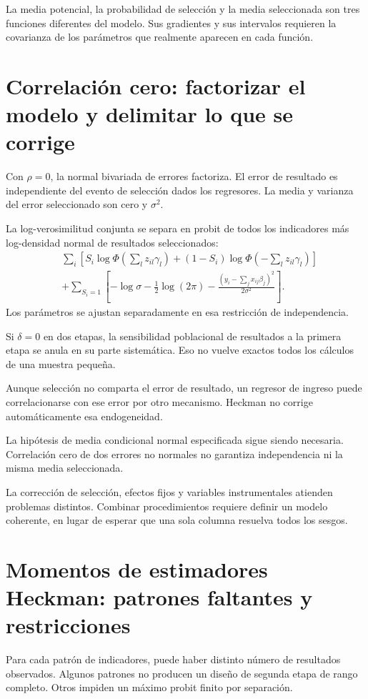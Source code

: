 \documentclass[11pt,a4paper]{article}
\begin{document}
La media potencial, la
probabilidad de selección
y la media seleccionada
son tres funciones
diferentes del modelo.
Sus gradientes y
sus intervalos requieren
la covarianza de los
parámetros que realmente
aparecen en cada función.

\clearpage
\section{Correlación cero: factorizar el modelo y delimitar lo que se corrige}\label{unidad152}
Con \(\rho=0\), la normal
bivariada de errores factoriza.
El error de resultado
es independiente del evento
de selección dados los
regresores.
La media y varianza
del error seleccionado
son cero y \(\sigma^2\).

La log-verosimilitud conjunta
se separa en probit
de todos los indicadores
más log-densidad normal
de resultados seleccionados:
\[
\begin{aligned}
&\sum_i[
S_i\log\Phi(\sum_lz_{il}\gamma_l)
+(1-S_i)\log\Phi(-\sum_lz_{il}\gamma_l)]\\
&+\sum_{S_i=1}
\left[-\log\sigma-\tfrac12\log(2\pi)
-\frac{(y_i-\sum_jx_{ij}\beta_j)^2}{2\sigma^2}\right].
\end{aligned}
\]
Los parámetros se ajustan
separadamente en esa
restricción de independencia.

Si \(\delta=0\) en
dos etapas, la sensibilidad
poblacional de resultados
a la primera etapa
se anula en su
parte sistemática.
Eso no vuelve exactos
todos los cálculos
de una muestra pequeña.

\begin{ejemplo}
Aunque selección no comparta
el error de resultado,
un regresor de ingreso
puede correlacionarse con
ese error por otro mecanismo.
Heckman no corrige
automáticamente esa endogeneidad.
\end{ejemplo}
La hipótesis de media
condicional normal especificada
sigue siendo necesaria.
Correlación cero de dos
errores no normales no
garantiza independencia ni
la misma media seleccionada.

La corrección de selección,
efectos fijos y variables
instrumentales atienden
problemas distintos.
Combinar procedimientos requiere
definir un modelo coherente,
en lugar de esperar
que una sola columna
resuelva todos los sesgos.

\clearpage
\section{Momentos de estimadores Heckman: patrones faltantes y restricciones}\label{unidad153}
Para cada patrón de indicadores,
puede haber distinto número
de resultados observados.
Algunos patrones no producen
un diseño de segunda etapa
de rango completo.
Otros impiden un máximo
probit finito por separación.
\end{document}
